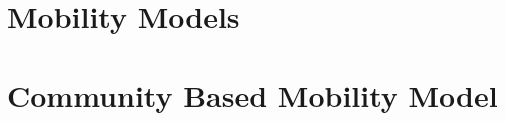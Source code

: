 \section{Mobility Models}
\label{mobility_models}


\section{Community Based Mobility Model}
\label{mobility_community_based_model}


